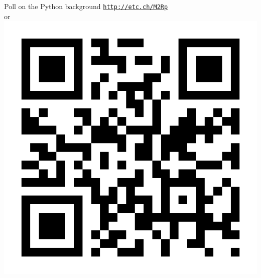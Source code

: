\begin{frame}{Poll on the Python background}
\centering 
\vskip 10pt
{\Large \href{http://etc.ch/M2Rp}{\textcolor{indigo(dye)}{\tt http://etc.ch/M2Rp}}}\\ 
or \\[10pt]
\includegraphics[height=0.4\columnwidth]{figures/intro/poll-python-background.png}
\end{frame}

